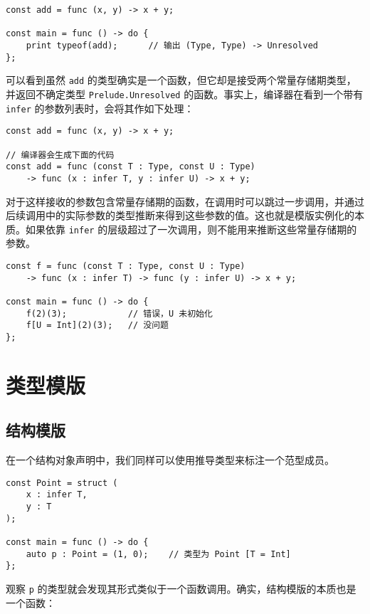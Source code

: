 \begin{lstlisting}
const add = func (x, y) -> x + y;

const main = func () -> do {
	print typeof(add);		// 输出 (Type, Type) -> Unresolved
};
\end{lstlisting}

可以看到虽然 \lstinline!add! 的类型确实是一个函数，但它却是接受两个常量存储期类型，并返回不确定类型 \lstinline!Prelude.Unresolved! 的函数。事实上，编译器在看到一个带有 \lstinline!infer! 的参数列表时，会将其作如下处理：

\begin{lstlisting}
const add = func (x, y) -> x + y;

// 编译器会生成下面的代码
const add = func (const T : Type, const U : Type) 
	-> func (x : infer T, y : infer U) -> x + y;
\end{lstlisting}

对于这样接收的参数包含常量存储期的函数，在调用时可以跳过一步调用，并通过后续调用中的实际参数的类型推断来得到这些参数的值。这也就是模版实例化的本质。如果依靠 \lstinline!infer! 的层级超过了一次调用，则不能用来推断这些常量存储期的参数。

\begin{lstlisting}
const f = func (const T : Type, const U : Type) 
	-> func (x : infer T) -> func (y : infer U) -> x + y;
	
const main = func () -> do {
	f(2)(3);			// 错误，U 未初始化
	f[U = Int](2)(3);	// 没问题
};
\end{lstlisting}

\section{类型模版}

\subsection{结构模版}

在一个结构对象声明中，我们同样可以使用推导类型来标注一个范型成员。

\begin{lstlisting}
const Point = struct (
	x : infer T,
	y : T
);

const main = func () -> do {
	auto p : Point = (1, 0);	// 类型为 Point [T = Int]
};
\end{lstlisting}

观察 \lstinline!p! 的类型就会发现其形式类似于一个函数调用。确实，结构模版的本质也是一个函数：

